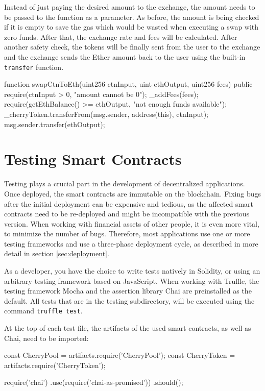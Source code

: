 Instead of just paying the desired amount to the exchange, the amount needs to be passed to the function as a parameter. As before, the amount is being checked
if it is empty to save the gas which would be wasted when executing a swap with zero funds. After that, the exchange rate and fees will be calculated. After
another safety check, the tokens will be finally sent from the user to the exchange and the exchange sends the Ether amount back to the user using the
built-in \texttt{transfer} function.

\begin{GenericCode}
  function swapCtnToEth(uint256 ctnInput, uint ethOutput, uint256 fees) public {
    require(ctnInput > 0, "amount cannot be 0");
    _addFees(fees);
    require(getEthBalance() >= ethOutput, "not enough funds available");
    _cherryToken.transferFrom(msg.sender, address(this), ctnInput);
    msg.sender.transfer(ethOutput);
  }
\end{GenericCode}

\section{Testing Smart Contracts}
Testing plays a crucial part in the development of decentralized applications. Once deployed, the smart contracts are immutable on the blockchain. Fixing bugs after the initial deployment can be expensive and tedious, as the affected smart contracts need to be re-deployed and might be incompatible with the previous version. When working with financial assets of other people, it is even more vital, to minimize the number of bugs. Therefore, most applications use one or more testing frameworks and use a three-phase deployment cycle, as described in more detail in section \ref{sec:deployment}.

As a developer, you have the choice to write tests natively in Solidity, or using an arbitrary testing framework based on JavaScript. When working with Truffle, the testing framework Mocha \cite{Mocha} and the assertion library Chai \cite{Chai} are preinstalled as the default. All tests that are in the testing subdirectory, will be executed using the command \texttt{truffle test}.

At the top of each test file, the artifacts of the used smart contracts, as well as Chai, need to be imported:
\begin{JsCode}
const CherryPool = artifacts.require('CherryPool');
const CherryToken = artifacts.require('CherryToken');

require('chai')
  .use(require('chai-as-promised'))
  .should();	
\end{JsCode}

